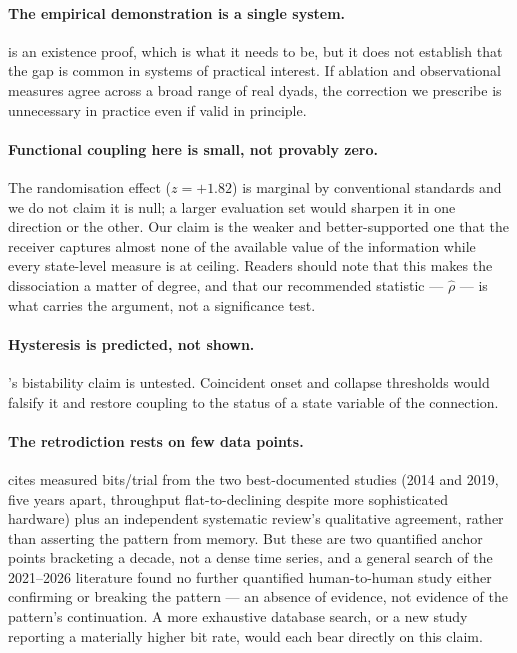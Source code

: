 \documentclass[11pt,a4paper]{article}
\theoremstyle{plain}
\theoremstyle{definition}
\theoremstyle{remark}
\begin{document}
\paragraph{The empirical demonstration is a single system.}
 is an existence proof, which is what it needs to be, but it does not establish that the gap is
common in systems of practical interest. If ablation and observational measures agree across a broad range of
real dyads, the correction we prescribe is unnecessary in practice even if valid in principle.

\paragraph{Functional coupling here is small, not provably zero.}
The randomisation effect ($z = +1.82$) is marginal by conventional standards and we do not claim it is null; a
larger evaluation set would sharpen it in one direction or the other. Our claim is the weaker and
better-supported one that the receiver captures almost none of the available value of the information while
every state-level measure is at ceiling. Readers should note that this makes the dissociation a matter of
degree, and that our recommended statistic --- $\hat{\rho}$ --- is what carries the argument, not a significance
test.

\paragraph{Hysteresis is predicted, not shown.}
's bistability claim is untested. Coincident onset and collapse thresholds would falsify it and
restore coupling to the status of a state variable of the connection.

\paragraph{The retrodiction rests on few data points.}
 cites measured bits/trial from the two best-documented studies (2014 and 2019, five years apart,
throughput flat-to-declining despite more sophisticated hardware) plus an independent systematic review's
qualitative agreement, rather than asserting the pattern from memory. But these are two quantified anchor points
bracketing a decade, not a dense time series, and a general search of the 2021--2026 literature found no further
quantified human-to-human study either confirming or breaking the pattern --- an absence of evidence, not
evidence of the pattern's continuation. A more exhaustive database search, or a new study reporting a materially
higher bit rate, would each bear directly on this claim.
\end{document}
